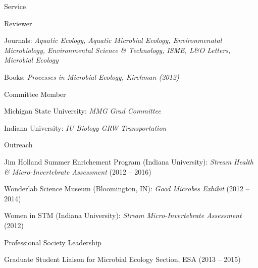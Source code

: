 \documentclass{resume} %
\begin{document}

\begin{rSection}{Service}

    \begin{rSubsection}{Reviewer}{}{}{}
        \item Journals: {\em Aquatic Ecology, Aquatic Microbial Ecology, Environmenatal Microbiology, Environmental Science \& Technology, ISME, L\&O Letters, Microbial Ecology}
        \item Books: {\em Processes in Microbial Ecology, Kirchman (2012)}
    \end{rSubsection}

    \begin{rSubsection}{Committee Member}{}{}{}
        \item Michigan State University: {\em MMG Grad Committee}
        \item Indiana University: {\em IU Biology GRW Transportation}
    \end{rSubsection}

    \begin{rSubsection}{Outreach}{}{}{}
        \item Jim Holland Summer Enrichement Program (Indiana University):
        {\em Stream Health \& Micro-Invertebrate Assessment} (2012 -- 2016)
        \item Wonderlab Science Museum (Bloomington, IN): {\em Good Microbes
        Exhibit} (2012 -- 2014)
        \item Women in STM (Indiana University): {\em Stream Micro-Invertebrate
        Assessment} (2012)
    \end{rSubsection}

    \begin{rSubsection}{Professional Society Leadership}{}{}{}
        \item Graduate Student Liaison for Microbial Ecology Section, ESA
              (2013 -- 2015)
        \item
        \item
    \end{rSubsection}


\end{rSection}
\end{document}
